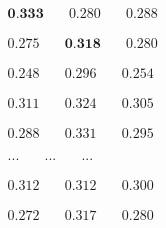 \newsavebox\embeddiobSF
\begin{lrbox}{\embeddiobSF}
   $\begin{aligned}
     \textbf{0.333} & \quad 0.280 & \quad 0.288
    \end{aligned} $
\end{lrbox}

\newsavebox\embeddiobFoote
\begin{lrbox}{\embeddiobFoote}
   $\begin{aligned}
     0.275 & \quad \textbf{0.318} & \quad 0.280
    \end{aligned} $
\end{lrbox}

\newsavebox\embeddiobCNMF
\begin{lrbox}{\embeddiobCNMF}
   $\begin{aligned}
     0.248 & \quad 0.296 & \quad 0.254
    \end{aligned} $
\end{lrbox}

\newsavebox\pcpSF
\begin{lrbox}{\pcpSF}
   $\begin{aligned}
     0.311 & \quad 0.324 & \quad 0.305
    \end{aligned} $
\end{lrbox}

\newsavebox\pcpFoote
\begin{lrbox}{\pcpFoote}
   $\begin{aligned}
     0.288 & \quad 0.331 & \quad 0.295
    \end{aligned} $
\end{lrbox}

\newsavebox\pcpCNMF
\begin{lrbox}{\pcpCNMF}
   $\begin{aligned}
     ... & \quad ... & \quad ...
    \end{aligned} $
\end{lrbox}

\newsavebox\tonnetzSF
\begin{lrbox}{\tonnetzSF}
   $\begin{aligned}
     0.312 & \quad 0.312 & \quad 0.300
    \end{aligned} $
\end{lrbox}

\newsavebox\tonnetzFoote
\begin{lrbox}{\tonnetzFoote}
   $\begin{aligned}
     0.272 & \quad 0.317 & \quad 0.280
    \end{aligned} $
\end{lrbox}

